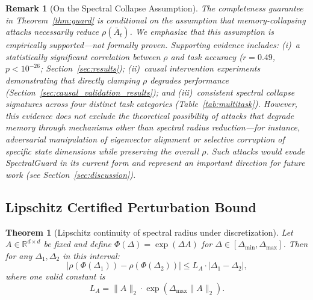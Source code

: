 \documentclass[10pt,twocolumn]{article}
\newtheorem{theorem}{Theorem}
\newtheorem{remark}{Remark}
\begin{document}
\begin{remark}[On the Spectral Collapse Assumption]
\label{rem:conditional_completeness}
The completeness guarantee in Theorem~\ref{thm:guard} is \emph{conditional} on the assumption that memory-collapsing attacks necessarily reduce $\rho(\bar{A}_t)$. We emphasize that this assumption is empirically supported---not formally proven. Supporting evidence includes: (i)~a statistically significant correlation between $\rho$ and task accuracy ($r=0.49$, $p < 10^{-26}$; Section~\ref{sec:results}); (ii)~causal intervention experiments demonstrating that directly clamping $\rho$ degrades performance (Section~\ref{sec:causal_validation_results}); and (iii)~consistent spectral collapse signatures across four distinct task categories (Table~\ref{tab:multitask}). However, this evidence does not exclude the theoretical possibility of attacks that degrade memory through mechanisms other than spectral radius reduction---for instance, adversarial manipulation of eigenvector alignment or selective corruption of specific state dimensions while preserving the overall $\rho$. Such attacks would evade SpectralGuard in its current form and represent an important direction for future work (see Section~\ref{sec:discussion}).
\end{remark}

\subsection{Lipschitz Certified Perturbation Bound}

\begin{theorem}[Lipschitz continuity of spectral radius under discretization]
\label{thm:lipschitz_rho}
Let $A\in\mathbb{R}^{d\times d}$ be fixed and define $\Phi(\Delta)=\exp(\Delta A)$ for $\Delta\in[\Delta_{\min},\Delta_{\max}]$. Then for any $\Delta_1,\Delta_2$ in this interval:
\begin{equation}
\left| \rho(\Phi(\Delta_1))-\rho(\Phi(\Delta_2)) \right|
\le
L_A \cdot |\Delta_1-\Delta_2|,
\end{equation}
where one valid constant is
\begin{equation}
L_A = \|A\|_2 \cdot \exp(\Delta_{\max}\|A\|_2).
\end{equation}
\end{theorem}
\end{document}
